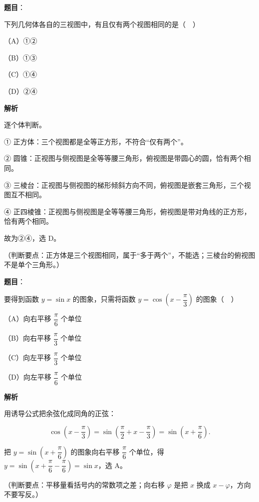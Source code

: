 \begin{answer}

\textbf{题目}：

下列几何体各自的三视图中，有且仅有两个视图相同的是（　）
\nopagebreak[4]
\begin{center}\end{center}
\nopagebreak[4]
（A）①②

（B）①③

（C）①④

（D）②④

\textbf{解析}

逐个体判断。

① 正方体：三个视图都是全等正方形，不符合“仅有两个”。

② 圆锥：正视图与侧视图是全等等腰三角形，俯视图是带圆心的圆，恰有两个相同。

③ 三棱台：正视图与侧视图的梯形倾斜方向不同，俯视图是嵌套三角形，三个视图互不相同。

④ 正四棱锥：正视图与侧视图是全等等腰三角形，俯视图是带对角线的正方形，恰有两个相同。

故为②④，选 D。

（判断要点：正方体是三个视图相同，属于“多于两个”，不能选；三棱台的俯视图不是单个三角形。）


\end{answer}
\begin{answer}

\textbf{题目}：

要得到函数 $y=\sin x$ 的图象，只需将函数 $y=\cos\left(x-\dfrac{\pi}{3}\right)$ 的图象（　）

（A）向右平移 $\dfrac{\pi}{6}$ 个单位

（B）向右平移 $\dfrac{\pi}{3}$ 个单位

（C）向左平移 $\dfrac{\pi}{3}$ 个单位

（D）向左平移 $\dfrac{\pi}{6}$ 个单位

\textbf{解析}

用诱导公式把余弦化成同角的正弦：

\nopagebreak[4]
\[\cos\left(x-\frac{\pi}{3}\right)=\sin\left(\frac{\pi}{2}+x-\frac{\pi}{3}\right)=\sin\left(x+\frac{\pi}{6}\right).\]

把 $y=\sin\left(x+\dfrac{\pi}{6}\right)$ 的图象向右平移 $\dfrac{\pi}{6}$ 个单位，得 $y=\sin\left(x+\dfrac{\pi}{6}-\dfrac{\pi}{6}\right)=\sin x$，选 A。

（判断要点：平移量看括号内的常数项之差；向右移 $\varphi$ 是把 $x$ 换成 $x-\varphi$，方向不要写反。）


\end{answer}
